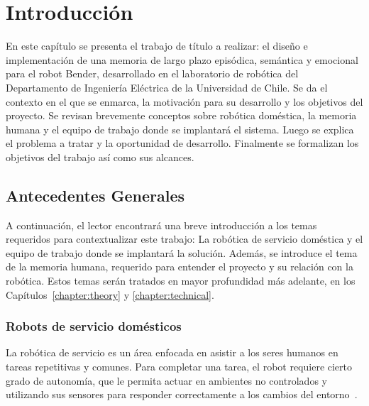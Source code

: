 \chapter{Introducción}\label{chapter:introduction}


En este capítulo se presenta el trabajo de título a realizar: el diseño e implementación de una memoria de largo plazo episódica, semántica y emocional para el robot Bender, desarrollado en el laboratorio de robótica del Departamento de Ingeniería Eléctrica de la Universidad de Chile. Se da el contexto en el que se enmarca, la motivación para su desarrollo y los objetivos del proyecto. Se revisan brevemente conceptos sobre robótica doméstica, la memoria humana y el equipo de trabajo donde se implantará el sistema. Luego se explica el problema a tratar y la oportunidad de desarrollo. Finalmente se formalizan los objetivos del trabajo así como sus alcances.


\section{Antecedentes Generales}

A continuación, el lector encontrará una breve introducción a los temas requeridos para contextualizar este trabajo: La robótica de servicio doméstica y el equipo de trabajo donde se implantará la solución. Además, se introduce el tema de la memoria humana, requerido para entender el proyecto y su relación con la robótica. Estos temas serán tratados en mayor profundidad más adelante, en los Capítulos~\ref{chapter:theory} y \ref{chapter:technical}.


\subsection{Robots de servicio domésticos}

La robótica de servicio es un área enfocada en asistir a los seres humanos en tareas repetitivas y comunes. Para completar una tarea, el robot requiere cierto grado de autonomía, que le permita actuar en ambientes no controlados y utilizando sus sensores para responder correctamente a los cambios del entorno~\cite{IFR}.

